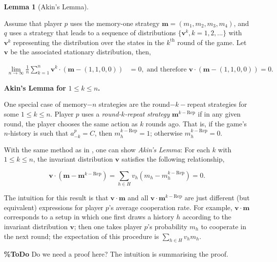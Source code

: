 \documentclass{article}
\theoremstyle{definition}
\newtheorem{lemma}[theorem]{Lemma}
\begin{document}
\begin{lemma}[Akin's Lemma]\label{lemma:akin}

Assume that player \(p\) uses the memory-one strategy \(\mathbf{m}=(m_1, m_2,
m_3, m_4)\), and \(q\) uses a strategy that leads to a sequence of distributions
\(\{\mathbf{v}^{k}, k = 1, 2, ...\}\) with \(\mathbf{v}^{k}\) representing the
distribution over the states in the \(k^{\text{th}}\) round of the game. Let
\(\mathbf{v}\) be the associated stationary distribution, then,

    \begin{align}
      \lim_{n \rightarrow \infty} \frac{1}{n} \sum_{k=1}^{n} \mathbf{v}^{k} \cdot (\mathbf{m} - (1, 1, 0 , 0)) & = 0, \text{ and therefore } \mathbf{v} \cdot (\mathbf{m} - (1, 1, 0, 0)) = 0.
    \end{align}
\end{lemma}

\textbf{Akin's Lemma for $1\!\le\!k\!\le\!n$.}

One special case of memory$-n$ strategies are the round$-k-$repeat strategies for
some $1\!\le\!k\!\le\!n$. Player $p$ uses a
{\it round-$k$-repeat strategy} $\mathbf{m}^{k-\text{Rep}}$ if in any given
round, the player chooses the same action as $k$ rounds ago. That is, if the
game's $n$-history is such that $a^p_{-k}\!=\!C$, then
$m^{k-\text{Rep}}_h\!=\!1$; otherwise $m^{k-\text{Rep}}_h\!=\!0$.

With the same method as in \citep{akin:EGADS:2016}, one can show {\it Akin's
Lemma}: For each $k$ with $1\!\le\!k\!\le\!n$, the invariant distribution
$\mathbf{v}$ satisfies the following relationship,

\begin{equation} \label{Eq:AkinsLemma}
\mathbf{v} \cdot (\mathbf{m}-\mathbf{m}^{k-\text{Rep}}) \!=\! \sum_{h\in H} v_h (m_h-m_h^{k-\text{Rep}}) = 0.
\end{equation}

The intuition for this result is that $\mathbf{v}\cdot \mathbf{m}$ and all
$\mathbf{v}\cdot \mathbf{m}^{k-\text{Rep}}$ are just different (but equivalent)
expressions for player $p$'s average cooperation rate. For example,
$\mathbf{v}\cdot\mathbf{m}$ corresponds to a setup in which one first draws a
history $h$ according to the invariant distribution $\mathbf{v}$; then one takes
player $p$'s probability $m_h$ to cooperate in the next round; the expectation
of this procedure is $\sum_{h\in H} v_h m_h$.

{\bf \%ToDo} Do we need a proof here? The intuition is summarising the proof.
\end{document}
